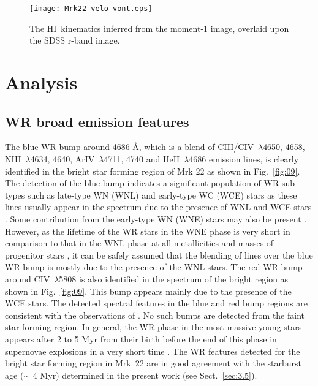 \documentclass[useAMS,usenatbib]{mn2e}
\def\HI{H{\small{I}}~}
\begin{document}
\begin{figure}
\centering
\texttt{[image: Mrk22-velo-vont.eps]}
\caption{The \HI kinematics inferred from the moment-1 image, overlaid upon the  SDSS r-band image.}
\label{fig:08}
\end{figure}

\section{Analysis} 

\subsection{WR broad emission features}

The blue WR bump around 4686 \AA, which is a blend of C{\small{III}}/C{\small{IV}}~$\lambda$4650, 4658, N{\small{III}}~$\lambda$4634, 4640, Ar{\small{IV}}~$\lambda$4711, 4740 and He{\small{II}}~$\lambda$4686 emission lines, is clearly identified in the bright star forming region of Mrk 22 as shown in Fig.~\ref{fig:09}. The detection of the blue bump indicates a significant population of WR sub-types such as late-type WN (WNL) and early-type WC (WCE) stars as these lines usually appear in the spectrum due to the presence of WNL and WCE stars \citep{1998ApJ...497..618S}. Some contribution from the early-type WN (WNE) stars may also be present \citep{1998ApJ...497..618S}. However, as the lifetime of the WR stars in the WNE phase is very short in comparison to that in the WNL phase at all metallicities and masses of progenitor stars \citep{1994A&A...287..803M}, it can be safely assumed that the blending of lines over the blue WR bump is mostly due to the presence of the WNL stars. The red WR bump around C{\small{IV}}~$\lambda$5808 is also identified in the spectrum of the bright region as shown in Fig.~\ref{fig:09}. This bump appears mainly due to the presence of the WCE stars. The detected spectral features in the blue and red bump regions are consistent with the observations of \citet{2000ApJ...531..776G}. No such bumps are detected from the faint star forming region. In general, the WR phase in the most massive young stars appears after 2 to 5 Myr from their birth before the end of this phase in supernovae explosions in a very short time \citep[$t_{WR}$ $\textless$ 0.5 Myr;][]{2005A&A...429..581M}. The WR features detected for the bright star forming region in Mrk~22 are in good agreement with the starburst age ($\sim$ 4 Myr) determined in the present work (see Sect.~\ref{sec:3.5}). 
\end{document}
